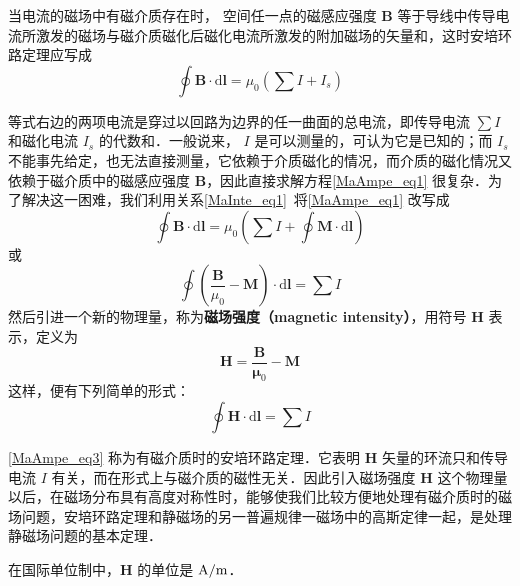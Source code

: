 

当电流的磁场中有磁介质存在时， 空间任一点的磁感应强度 $\mathbf B $ 等于导线中传导电流所激发的磁场与磁介质磁化后磁化电流所激发的附加磁场的矢量和，这时安培环路定理应写成
\begin{equation} \label{MaAmpe_eq1}
\oint \mathbf{B} \cdot \mathrm{d} \mathbf{l}=\mu_{0}\left(\sum I+I_{s}\right)
\end{equation}

等式右边的两项电流是穿过以回路为边界的任一曲面的总电流，即传导电流 $\sum I$ 和磁化电流 $I_s$ 的代数和．一般说来， $I $ 是可以测量的，可认为它是已知的；而 $I_s$ 不能事先给定，也无法直接测量，它依赖于介质磁化的情况，而介质的磁化情况又依赖于磁介质中的磁感应强度 $\mathbf B$，因此直接求解方程\autoref{MaAmpe_eq1} 很复杂．为了解决这一困难，我们利用关系\autoref{MaInte_eq1}~将\autoref{MaAmpe_eq1} 改写成
\begin{equation}
\oint \mathbf{B} \cdot \mathrm{d} \mathbf{l}=\mu_{0}\left(\sum I+\oint \mathbf{M} \cdot \mathrm{d} \mathbf{l}\right)
\end{equation}
或
\begin{equation} 
\oint\left(\frac{\mathbf{B}}{\mu_{0}}-\mathbf{M}\right) \cdot \mathrm{d} \mathbf{l}=\sum I
\end{equation}
然后引进一个新的物理量，称为\textbf{磁场强度（magnetic intensity）}，用符号 $\mathbf H$ 表示，定义为
\begin{equation} \label{MaAmpe_eq2}
\mathbf{H}=\frac{\mathbf{B}}{\mathbf{\mu}_{0}}-\mathbf{M}
\end{equation}
这样，便有下列简单的形式： 
\begin{equation} \label{MaAmpe_eq3}
\oint \mathbf{H} \cdot \mathrm{d} \mathbf{l}=\sum I
\end{equation}

\autoref{MaAmpe_eq3} 称为有磁介质时的安培环路定理．它表明 $\mathbf H $ 矢量的环流只和传导电流 $I $ 有关，而在形式上与磁介质的磁性无关．因此引入磁场强度 $\mathbf H $ 这个物理量以后，在磁场分布具有高度对称性时，能够使我们比较方便地处理有磁介质时的磁场问题，安培环路定理和静磁场的另一普遍规律一磁场中的高斯定律一起，是处理静磁场问题的基本定理．

在国际单位制中，$\mathbf  H $ 的单位是 $\rm A/m$．

